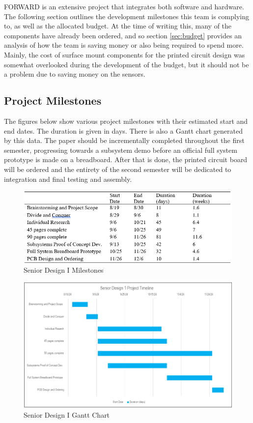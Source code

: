\noindent FORWARD is an extensive project that integrates both software and hardware. The following section outlines the development milestones this team is complying to, as well as the allocated budget. At the time of writing this, many of the components have already been ordered, and so section \ref{sec:budget} provides an analysis of how the team is saving money or also being required to spend more. Mainly, the cost of surface mount components for the printed circuit design was somewhat overlooked during the development of the budget, but it should not be a problem due to saving money on the sensors.\\

\subsection{Project Milestones}
\noindent The figures below show various project milestones with their estimated start and end dates. The duration is given in days. There is also a Gantt chart generated by this data. The paper should be incrementally completed throughout the first semester, progressing towards a subsystem demo before an official full system prototype is made on a breadboard. After that is done, the printed circuit board will be ordered and the entirety of the second semester will be dedicated to integration and final testing and assembly. \\

\begin{figure}[H]
	\centering
	\includegraphics[width=\textwidth]{./Images/SD1mile.png}
	\caption{\label{fig:SD1mile}Senior Design I Milestones}
\end{figure}

\begin{figure}[H]
	\centering
	\includegraphics[width=\textwidth]{./Images/SD1gantt.png}
	\caption{\label{fig:SD1gantt}Senior Design I Gantt Chart}
\end{figure}

